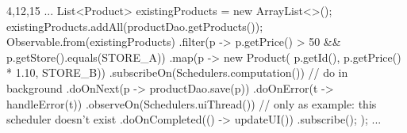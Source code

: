 \begin{javacode}{4,12,15}
...
List<Product> existingProducts = new ArrayList<>();
	existingProducts.addAll(productDao.getProducts());
	Observable.from(existingProducts)
		.filter(p -> 
					p.getPrice() > 50 && 
					p.getStore().equals(STORE_A))
		.map(p -> new Product(
						p.getId(), 
						p.getPrice() * 1.10, 
						STORE_B))
		.subscribeOn(Schedulers.computation()) // do in background
		.doOnNext(p -> productDao.save(p))
		.doOnError(t -> handleError(t))
		.observeOn(Schedulers.uiThread()) // only as example: this scheduler doesn't exist
		.doOnCompleted(() -> updateUI())
		.subscribe();
	);
...
\end{javacode}